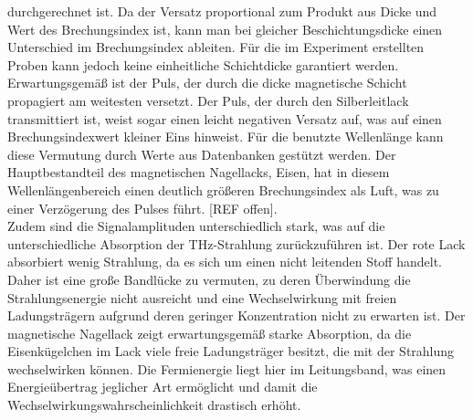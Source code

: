 durchgerechnet ist. Da der Versatz proportional zum 
Produkt aus Dicke und Wert des Brechungsindex ist, 
kann man bei gleicher Beschichtungsdicke einen 
Unterschied im Brechungsindex ableiten. 
Für die im Experiment erstellten Proben kann 
jedoch keine einheitliche Schichtdicke garantiert werden.
Erwartungsgemäß ist der Puls, der durch die dicke magnetische Schicht propagiert
am weitesten versetzt. Der Puls, der durch den Silberleitlack 
transmittiert ist, weist sogar einen leicht negativen Versatz auf, was 
auf einen Brechungsindexwert kleiner Eins hinweist. 
Für die benutzte Wellenlänge kann diese Vermutung durch 
Werte aus Datenbanken gestützt werden. Der Hauptbestandteil 
des magnetischen Nagellacks, Eisen, hat in diesem Wellenlängenbereich 
einen deutlich größeren Brechungsindex als Luft, was zu einer Verzögerung des 
Pulses führt. [REF offen]. \\
Zudem sind die Signalamplituden unterschiedlich stark, was 
auf die unterschiedliche Absorption der THz-Strahlung zurückzuführen 
ist. Der rote Lack absorbiert wenig Strahlung, da es sich 
um einen nicht leitenden Stoff handelt. Daher ist eine 
große Bandlücke zu vermuten, zu deren Überwindung die 
Strahlungsenergie nicht ausreicht und eine Wechselwirkung mit freien 
Ladungsträgern aufgrund deren geringer Konzentration nicht zu 
erwarten ist. Der magnetische Nagellack zeigt erwartungsgemäß 
starke Absorption, da die Eisenkügelchen im Lack viele 
freie Ladungsträger besitzt, die mit der Strahlung wechselwirken
können. Die Fermienergie liegt hier im Leitungsband, was 
einen Energieübertrag jeglicher Art ermöglicht und 
damit die Wechselwirkungswahrscheinlichkeit drastisch erhöht. 